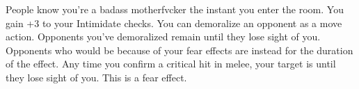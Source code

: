 {People know you're a badass motherfvcker the instant you enter the room.}
{You gain +3 to your Intimidate checks.}
{You can demoralize an opponent as a move action.}
{Opponents you've demoralized remain  until they lose sight of you.}
{Opponents who would be  because of your fear effects are  instead for the duration of the effect.}
{Any time you confirm a critical hit in melee, your target is  until they lose sight of you. This is a fear effect.}